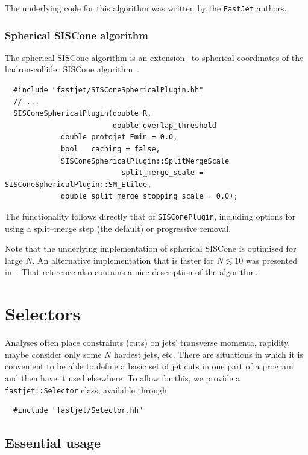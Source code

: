 \documentclass[12pt,a4]{article}
\newcommand{\fastjet}{\texttt{FastJet}\xspace}
\newcommand{\ttt}[1]{{\small\texttt{#1}}}
\begin{document}
The underlying code for this algorithm was written by the \fastjet
authors.

\subsubsection{Spherical SISCone algorithm}
\label{sec:spherical-siscone}

The spherical SISCone algorithm is an extension~\cite{SpheriSISCone}
to spherical coordinates of the hadron-collider SISCone
algorithm~\cite{SISCone}.
\begin{lstlisting}
  #include "fastjet/SISConeSphericalPlugin.hh"
  // ...
  SISConeSphericalPlugin(double R, 
                         double overlap_threshold
			 double protojet_Emin = 0.0, 
			 bool   caching = false,
			 SISConeSphericalPlugin::SplitMergeScale  
                           split_merge_scale = SISConeSphericalPlugin::SM_Etilde,
			 double split_merge_stopping_scale = 0.0);
\end{lstlisting}
The functionality follows directly that of \ttt{SISConePlugin},
including options for using a split--merge step (the default) or
progressive removal.

Note that the underlying implementation of spherical SISCone is
optimised for large $N$. 
%
An alternative implementation that is faster for $N \lesssim 10$ was
presented in~\cite{Weinzierl:2011jx}. That reference also contains a
nice description of the algorithm.


\section{Selectors}
\label{sect:selectors}

Analyses often place constraints (cuts) on jets' transverse momenta,
rapidity, maybe consider only some $N$ hardest jets, etc.
%
There are situations in which it is convenient to be able to define
a basic set of jet cuts in one part of a program and then have it used
elsewhere.
%
To allow for this, we provide a \ttt{fastjet::Selector} class, available
through 
\begin{lstlisting}
  #include "fastjet/Selector.hh"
\end{lstlisting}

\subsection{Essential usage}
\end{document}
